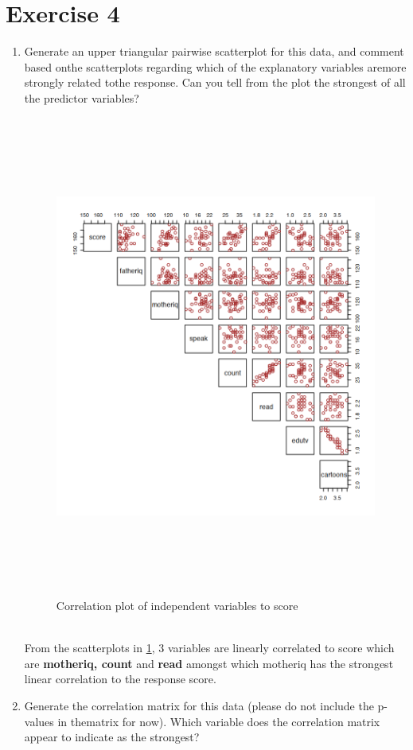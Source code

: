 \documentclass[12pt,a4paper]{article}
\begin{document}
\section*{Exercise 4}
\begin{enumerate}
	\item[(1)] Generate an upper triangular pairwise scatterplot for this data, and comment based onthe scatterplots regarding which of the explanatory variables aremore strongly related tothe response. Can you tell from the plot the strongest of all the predictor variables?\\
			\begin{figure}[!h]
				\includegraphics[width=520pt,height=450pt]{./graphics/q41.png}
				\caption{Correlation plot of independent variables to score}
				\label{fig:03}
		\end{figure}
\\From the scatterplots  in \ref{fig:03},  3 variables are linearly correlated to score which are \textbf{motheriq, count} and \textbf{read} amongst which motheriq has the strongest linear correlation to the response score.
	\item[(2)]  Generate the correlation matrix for this data (please do not include the p-values in thematrix for now). Which variable does the correlation matrix appear to indicate as the strongest?\\

\end{enumerate}
\end{document}
